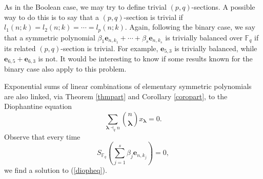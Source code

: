 As in the Boolean case, we may try to define trivial $(p,q)$-sections.  A possible way to do this is to say that a $(p,q)$-section is trivial if $l_1(n;k)=l_2(n;k)=\cdots=l_{p}(n;k)$.   Again, following the
binary case, we say that a symmetric polynomial $\beta_1\boldsymbol{e}_{n,k_1}+\cdots+\beta_s\boldsymbol{e}_{n,k_s}$ is trivially balanced over $\mathbb{F}_q$ if its related $(p,q)$-section is trivial.
For example, $\boldsymbol{e}_{5,3}$ is trivially balanced, while $\boldsymbol{e}_{6,5}+\boldsymbol{e}_{6,3}$ is not.  It would be interesting to know if some results known for the binary case also apply to this problem.  

Exponential sums of linear combinations of elementary symmetric polynomials are also linked, via Theorem \ref{thmpart} and Corollary \ref{coropart}, to the Diophantine equation
\begin{equation}
\label{diopheq}
 \sum_{\boldsymbol{\lambda}\dashv_q n} \binom{n}{\boldsymbol{\lambda}} x_{\boldsymbol{\lambda}}=0.
\end{equation}
Observe that every time 
$$S_{\mathbb{F}_q}\left(\sum_{j=1}^s \beta_j \boldsymbol{e}_{n,k_j}\right)=0,$$
we find a solution to (\ref{diopheq}).

